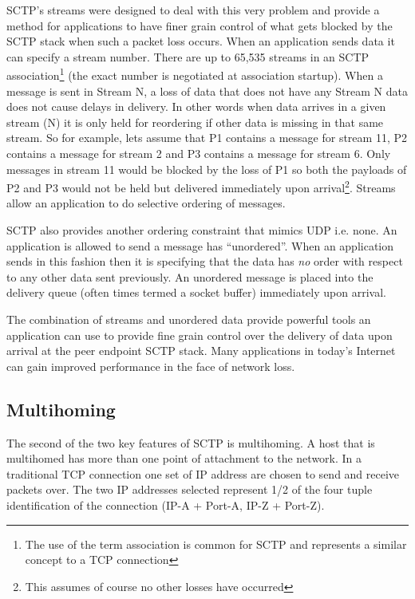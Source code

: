 \documentclass[conference]{IEEEtran}
\begin{document}
SCTP's streams were designed to deal with this very problem and provide a
method for applications to have finer grain control of what gets blocked by
the SCTP stack when such a packet loss occurs. When an application sends
data it can specify a stream number. There are up to 65,535 streams in an
SCTP association\footnote{The use of the term association is common for SCTP and
represents a similar concept to a TCP connection}
(the exact number is negotiated at association startup).
When a message is sent in Stream N, a loss of data  that does not have
any Stream N data does not cause delays in delivery. In other words when data arrives
in a given stream (N) it is only held for reordering if other data is missing in that same stream.
So for example, lets assume that P1 contains a message for stream 11, P2 contains a message for stream 2 and 
P3 contains a message for stream 6. Only messages in stream 11 would be blocked by
the loss of P1 so both the payloads of P2 and P3 would not be held but delivered 
immediately upon arrival\footnote{This assumes of course no other losses have occurred}.
Streams allow an application to do selective ordering of messages. 

SCTP also provides another ordering constraint that mimics UDP i.e. none. An application
is allowed to send a message has ``unordered''. When an application sends in this
fashion then it is specifying that the data has \emph{no} order with respect to any other
data sent previously. An unordered message is placed into the delivery queue (often
times termed a socket buffer) immediately upon arrival. 

The combination of streams and unordered data provide powerful tools an application
can use to provide fine grain control over the delivery of data upon arrival at
the peer endpoint SCTP stack. Many applications in today's Internet can gain
improved performance in the face of network loss.

\subsection{Multihoming}
\label{multi}
The second of the two key features of SCTP is multihoming. A host that
is multihomed has more than one point of attachment to the network.
In a traditional TCP connection one set of IP address are chosen to 
send and receive packets over. The two IP addresses selected represent
1/2 of the four tuple identification of the connection (IP-A + Port-A, IP-Z + Port-Z).
\end{document}
